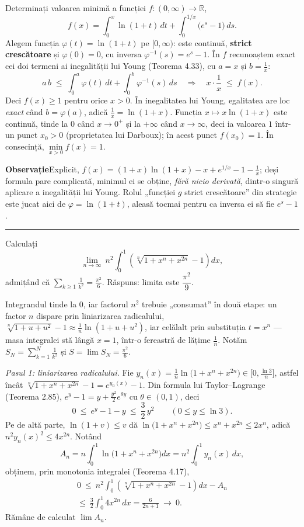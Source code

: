 Determinați valoarea minimă a funcției $f : (0,\infty) \to \mathbb{R}$,
\[
  f(x) = \int_0^x \ln(1+t)\,dt + \int_0^{1/x} \bigl(e^{s}-1\bigr)\,ds.
\]
\sol Alegem funcția $\varphi(t) = \ln(1+t)$ pe $[0,\infty)$: este continuă, \textbf{strict crescătoare} și $\varphi(0) = 0$, cu inversa $\varphi^{-1}(s) = e^{s} - 1$. În $f$ recunoaștem exact cei doi termeni ai inegalității lui Young (Teorema 4.33), cu $a = x$ și $b = \frac{1}{x}$:
\[
  a\,b \;\le\; \int_0^a \varphi(t)\,dt + \int_0^b \varphi^{-1}(s)\,ds
  \quad\Longrightarrow\quad
  x \cdot \frac{1}{x} \;\le\; f(x).
\]
Deci $f(x) \ge 1$ pentru orice $x > 0$. În inegalitatea lui Young, egalitatea are loc \emph{exact} când $b = \varphi(a)$, adică $\frac{1}{x} = \ln(1+x)$. Funcția $x \mapsto x\ln(1+x)$ este continuă, tinde la $0$ când $x \to 0^{+}$ și la $+\infty$ când $x \to \infty$, deci ia valoarea $1$ într-un punct $x_0 > 0$ (proprietatea lui Darboux); în acest punct $f(x_0) = 1$. În consecință, $\min\limits_{x>0} f(x) = 1$.

\medskip
\noindent\textbf{Observație}\quad Explicit, $f(x) = (1+x)\ln(1+x) - x + e^{1/x} - 1 - \frac{1}{x}$; deși formula pare complicată, minimul ei se obține, \emph{fără nicio derivată}, dintr-o singură aplicare a inegalității lui Young. Rolul „funcției $g$ strict crescătoare'' din strategie este jucat aici de $\varphi = \ln(1+t)$, aleasă tocmai pentru ca inversa ei să fie $e^{s} - 1$.
\vspace{1mm}\hrule

Calculați
\[ \lim_{n\to\infty}\ n^{2}\int_{0}^{1}\left(\sqrt[n]{1+x^{n}+x^{2n}}-1\right)dx , \]
admițând că $\displaystyle\sum_{k\ge1}\frac{1}{k^{2}}=\frac{\pi^{2}}{6}$.
\sol Răspuns: limita este $\dfrac{\pi^{2}}{9}$.

Integrandul tinde la $0$, iar factorul $n^{2}$ trebuie „consumat'' în două etape: un factor $n$ dispare prin liniarizarea radicalului, $\sqrt[n]{1+u+u^{2}}-1\approx\frac1n\ln(1+u+u^{2})$, iar celălalt prin substituția $t=x^{n}$ --- masa integralei stă lângă $x=1$, într-o fereastră de lățime $\frac1n$. Notăm $S_{N}=\sum_{k=1}^{N}\frac1{k^{2}}$ și $S=\lim S_{N}=\frac{\pi^{2}}{6}$.

\emph{Pasul 1: liniarizarea radicalului.} Fie $y_{n}(x)=\frac1n\ln\bigl(1+x^{n}+x^{2n}\bigr)\in\bigl[0,\frac{\ln3}{n}\bigr]$, astfel încât $\sqrt[n]{1+x^{n}+x^{2n}}-1=e^{y_{n}(x)}-1$. Din formula lui Taylor--Lagrange (Teorema 2.85), $e^{y}-1=y+\frac{y^{2}}{2}e^{\theta y}$ cu $\theta\in(0,1)$, deci
\[ 0\ \le\ e^{y}-1-y\ \le\ \frac32\,y^{2}\qquad(0\le y\le\ln3) . \]
Pe de altă parte, $\ln(1+v)\le v$ dă $\ln\bigl(1+x^{n}+x^{2n}\bigr)\le x^{n}+x^{2n}\le2x^{n}$, adică $n^{2}y_{n}(x)^{2}\le4x^{2n}$. Notând
\[ A_{n}=n\int_{0}^{1}\ln\bigl(1+x^{n}+x^{2n}\bigr)dx=n^{2}\int_{0}^{1}y_{n}(x)\,dx , \]
obținem, prin monotonia integralei (Teorema 4.17),
\[ \begin{gathered} 0\ \le\ n^{2}\int_{0}^{1}\left(\sqrt[n]{1+x^{n}+x^{2n}}-1\right)dx-A_{n}\\ \le\ \frac32\int_{0}^{1}4x^{2n}\,dx=\frac{6}{2n+1}\ \longrightarrow\ 0 . \end{gathered} \]
Rămâne de calculat $\lim A_{n}$.

